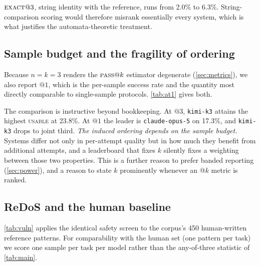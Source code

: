 \documentclass[11pt]{article}
\newcommand{\pass}{\textsc{pass}}
\newcommand{\usable}{\textsc{usable}}
\newcommand{\exact}{\textsc{exact}}
\begin{document}
$\exact{}@3$, string identity with the reference, runs from 2.0\% to 6.3\%.
String-comparison scoring would therefore misrank essentially every system,
which is what justifies the automata-theoretic treatment.

\subsection{Sample budget and the fragility of ordering}
\label{sec:atk}

Because $n=k=3$ renders the $\pass{}@k$ estimator degenerate
(\cref{sec:metrics}), we also report $@1$, which is the per-sample
success rate and the quantity most directly comparable to single-sample
protocols. \cref{tab:at1} gives both.

\begin{table}[htbp]
\centering
\small

\caption{Per-sample ($@1$) against any-of-three ($@3$) estimates, computed
from per-sample success counts. The final column gives the number of tasks
with fewer than three usable samples, which are excluded from that model's
$@3$ estimate. That is why $@3$ here differs slightly from \cref{tab:main},
which is computed over all answered tasks.}
\label{tab:at1}
\end{table}

The comparison is instructive beyond bookkeeping. At $@3$,
\texttt{kimi-k3} attains the highest \usable{} at 23.8\%. At $@1$ the leader
is \texttt{claude-opus-5} on 17.3\%, and \texttt{kimi-k3} drops to joint
third.
\emph{The induced ordering depends on the sample budget.} Systems differ not
only in per-attempt quality but in how much they benefit from additional
attempts, and a leaderboard that fixes $k$ silently fixes a weighting between
those two properties. This is a further reason to prefer banded reporting
(\cref{sec:power}), and a reason to state $k$ prominently whenever an @$k$
metric is ranked.

\subsection{ReDoS and the human baseline}
\label{sec:humanbaseline}

\cref{tab:vuln} applies the identical safety screen to the corpus's 450
human-written reference patterns. For comparability with the human set (one
pattern per task) we score one sample per task per model rather than the
any-of-three statistic of \cref{tab:main}.

\begin{table}[htbp]
\centering
\small

\caption{ReDoS screening of model outputs against the corpus's own
human-written reference patterns, one pattern per task in all cases. The final
column is the exact McNemar test against the reference set on the same tasks;
see below for why an independent interval would be the wrong instrument here.}
\label{tab:vuln}
\end{table}
\end{document}
